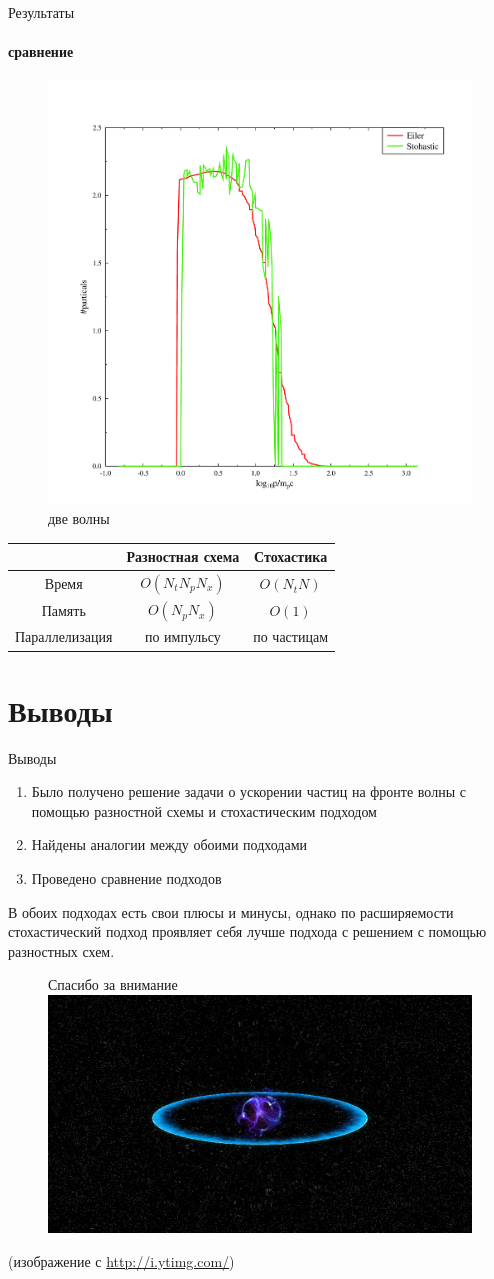 \documentclass[8pt,pdf,hyperref={unicode},serif]{beamer}
\begin{document}
\begin{frame}{Результаты}
\framesubtitle{сравнение}
\begin{figure}[H]
\centering
\includegraphics[width=0.3\linewidth]{compare}
\caption{две волны}
\end{figure}

\begin{tabular}{|c|c|c|}
\hline
& Разностная схема & Стохастика \\ \hline
Время & $O(N_tN_pN_x)$ & $O(N_tN)$\\ \hline
Память & $O(N_pN_x)$ & $O(1)$\\ \hline
Параллелизация & по импульсу & по частицам\\ \hline
\end{tabular}
\end{frame}
\section{Выводы}
\begin{frame}{Выводы}
\begin{enumerate}
\item Было получено решение задачи о ускорении частиц на фронте волны с помощью разностной схемы и стохастическим подходом
\item Найдены аналогии между обоими подходами
\item Проведено сравнение подходов
\end{enumerate}
\pause
В обоих подходах есть свои плюсы и минусы, однако по расширяемости стохастический подход проявляет себя лучше подхода с решением с помощью разностных схем.
\end{frame}

\begin{frame}

\begin{figure}[H]
\centering \Large
Спасибо за внимание
\includegraphics[width=0.8\linewidth]{shock_ill}
\end{figure}
{\small (изображение с \url{http://i.ytimg.com/})}
\end{frame}
\end{document}
